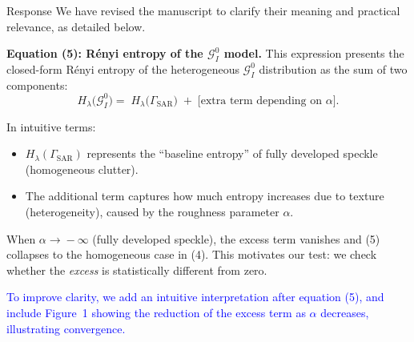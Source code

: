 \documentclass[11pt]{report}
\begin{document}
\begin{responsebox}{Response}
 We have revised the manuscript to clarify their meaning and practical relevance, as detailed below.

\vspace{0.5em}

\textbf{Equation (5): Rényi entropy of the $\mathcal{G}^{0}_{\!I}$ model.}  
This expression presents the closed-form Rényi entropy of the heterogeneous $\mathcal{G}^{0}_{\!I}$ distribution as the sum of two components:
\[
H_\lambda\bigl(\mathcal{G}^{0}_{\!I}\bigr)
=\;H_\lambda\bigl(\Gamma_{\text{SAR}}\bigr)
\;+\;\bigl[\text{extra\ term depending on }\alpha\bigr].
\]

In intuitive terms:
\begin{itemize}
	\item $H_\lambda(\Gamma_{\text{SAR}})$ represents the “baseline entropy” of fully developed speckle (homogeneous clutter).
	\item The additional term captures how much entropy increases due to texture (heterogeneity), caused by the roughness parameter $\alpha$.
\end{itemize}
When $\alpha\!\to\!-\infty$ (fully developed speckle), the excess term vanishes and (5) collapses to the homogeneous case in (4).  This motivates our test: we check whether the \emph{excess} is statistically different from zero.



\vspace{0.3em}
\textcolor{blue}{To improve clarity, we add an intuitive interpretation after equation (5), and include Figure~1 showing the reduction of the excess term as $\alpha$ decreases, illustrating convergence.}
\end{responsebox}
\end{document}
